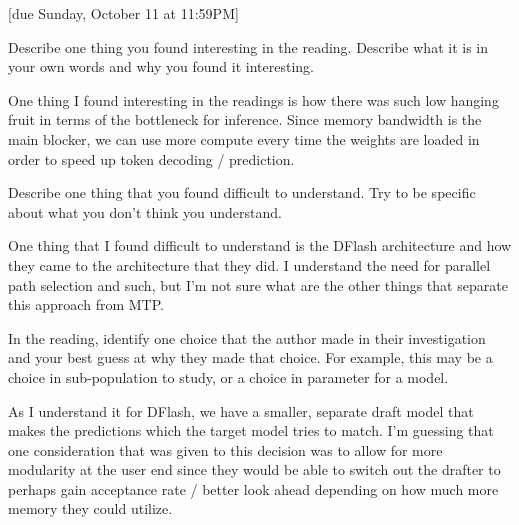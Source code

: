 \documentclass{article}
\begin{document}
[due Sunday, October 11 at 11:59PM]

\begin{probset}
\begin{prob}
    Describe one thing you found interesting in the reading. Describe what it is in your own words and why you found it interesting.

    \begin{soln}
        One thing I found interesting in the readings is how there was such low hanging fruit in terms of the bottleneck for inference. Since memory bandwidth is the main blocker, we can use more compute every time the weights are loaded in order to speed up token decoding / prediction.
    \end{soln}
\end{prob}

\begin{prob}
    Describe one thing that you found difficult to understand. Try to be specific about what you don't think you understand.

    \begin{soln}
        One thing that I found difficult to understand is the DFlash architecture and how they came to the architecture that they did. I understand the need for parallel path selection and such, but I'm not sure what are the other things that separate this approach from MTP.
    \end{soln}
\end{prob}

\begin{prob}
    In the reading, identify one choice that the author made in their investigation and your best guess at why they made that choice. For example, this may be a choice in sub-population to study, or a choice in parameter for a model.

    \begin{soln}
        As I understand it for DFlash, we have a smaller, separate draft model that makes the predictions which the target model tries to match. I'm guessing that one consideration that was given to this decision was to allow for more modularity at the user end since they would be able to switch out the drafter to perhaps gain acceptance rate / better look ahead depending on how much more memory they could utilize.
    \end{soln}
\end{prob}
\end{probset}
\end{document}
